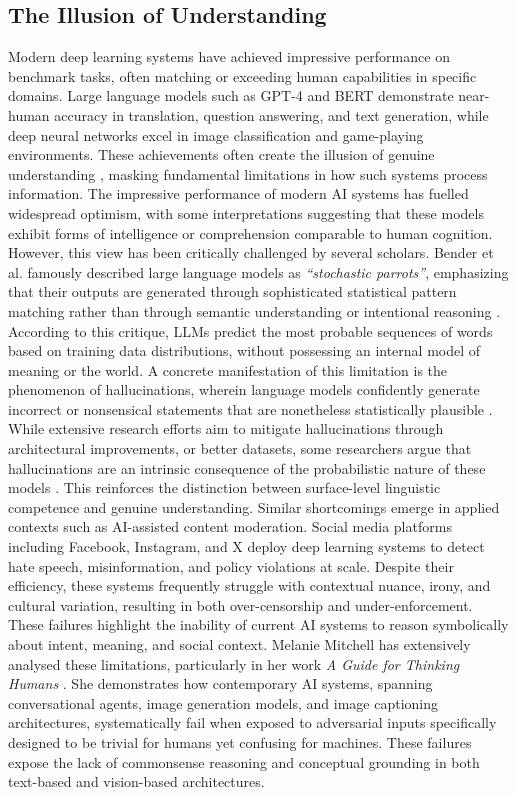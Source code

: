 \documentclass[12pt,a4paper]{report}
\begin{document}
\subsection{The Illusion of Understanding}
Modern deep learning systems have achieved impressive performance on benchmark tasks, often matching or exceeding human capabilities in specific domains. Large language models such as GPT-4 and BERT demonstrate near-human accuracy in translation, question answering, and text generation, while deep neural networks excel in image classification and game-playing environments. These achievements often create the illusion of genuine understanding \cite{chiave8}, masking fundamental limitations in how such systems process information.
The impressive performance of modern AI systems has fuelled widespread optimism, with some interpretations suggesting that these models exhibit forms of intelligence or comprehension comparable to human cognition. However, this view has been critically challenged by several scholars. Bender et al. famously described large language models as \textit{“stochastic parrots”}, emphasizing that their outputs are generated through sophisticated statistical pattern matching rather than through semantic understanding or intentional reasoning \cite{chiave3}. According to this critique, LLMs predict the most probable sequences of words based on training data distributions, without possessing an internal model of meaning or the world.
A concrete manifestation of this limitation is the phenomenon of hallucinations, wherein language models confidently generate incorrect or nonsensical statements that are nonetheless statistically plausible \cite{chiave4}. While extensive research efforts aim to mitigate hallucinations through architectural improvements, or better datasets, some researchers argue that hallucinations are an intrinsic consequence of the probabilistic nature of these models \cite{chiave9}. This reinforces the distinction between surface-level linguistic competence and genuine understanding.
Similar shortcomings emerge in applied contexts such as AI-assisted content moderation. Social media platforms including Facebook, Instagram, and X deploy deep learning systems to detect hate speech, misinformation, and policy violations at scale. Despite their efficiency, these systems frequently struggle with contextual nuance, irony, and cultural variation, resulting in both over-censorship and under-enforcement. These failures highlight the inability of current AI systems to reason symbolically about intent, meaning, and social context.
Melanie Mitchell has extensively analysed these limitations, particularly in her work \textit{A Guide for Thinking Humans} \cite{chiave46}. She demonstrates how contemporary AI systems, spanning conversational agents, image generation models, and image captioning architectures, systematically fail when exposed to adversarial inputs specifically designed to be trivial for humans yet confusing for machines. These failures expose the lack of commonsense reasoning and conceptual grounding in both text-based and vision-based architectures.
\end{document}
